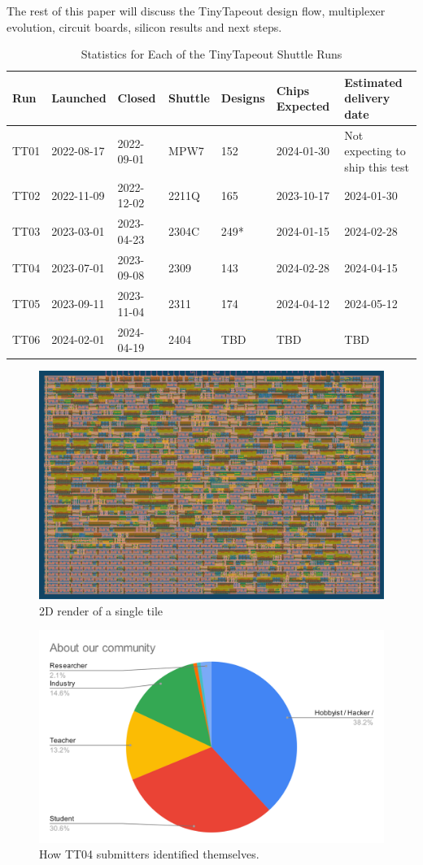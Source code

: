 The rest of this paper will discuss the TinyTapeout design flow, multiplexer evolution, circuit boards, silicon results and next steps.

\begin{table}[!t]
\centering
\caption{Statistics for Each of the TinyTapeout Shuttle Runs}
\label{tab:tinytapeout}
\begin{tabularx}{\textwidth}{@{}l *{6}{X}@{}}
\toprule
\textbf{Run} & \textbf{Launched} & \textbf{Closed} & \textbf{Shuttle} & \textbf{Designs} & \textbf{Chips Expected} & \textbf{Estimated delivery date} \\
\midrule
TT01 & 2022-08-17 & 2022-09-01 & MPW7  & 152 & 2024-01-30 & Not expecting to ship this test \\
TT02 & 2022-11-09 & 2022-12-02 & 2211Q & 165 & 2023-10-17 & 2024-01-30 \\
TT03 & 2023-03-01 & 2023-04-23 & 2304C & 249* & 2024-01-15 & 2024-02-28 \\
TT04 & 2023-07-01 & 2023-09-08 & 2309  & 143 & 2024-02-28 & 2024-04-15 \\
TT05 & 2023-09-11 & 2023-11-04 & 2311  & 174 & 2024-04-12 & 2024-05-12 \\
TT06 & 2024-02-01 & 2024-04-19 & 2404  & TBD & TBD        & TBD \\
\bottomrule
\end{tabularx}
\end{table}

\begin{figure}[!t]
\centering
\includegraphics[width=\columnwidth]{./Figs/gh action gds layout.png}
\caption{2D render of a single tile}
\label{fig:render_cells_in_use}
\end{figure}

\begin{figure}[!t]
\centering
\includegraphics[width=\columnwidth]{./Figs/about our community pie chart.png}
\caption{How TT04 submitters identified themselves.}
\label{fig:TT04_submitters}
\end{figure}
